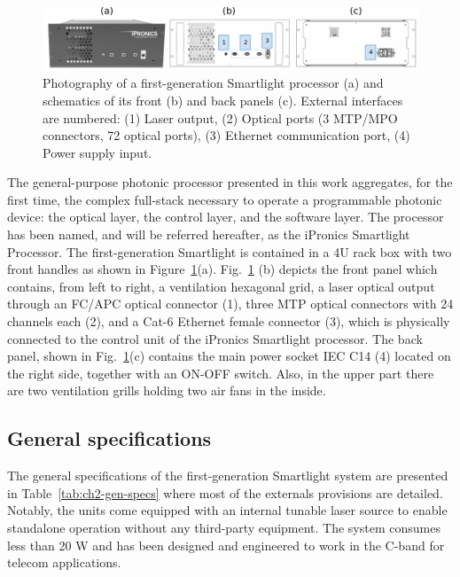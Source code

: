 \begin{figure}[h]
	\begin{center}
		\includegraphics{figures/ch2-smartlight.pdf}
	\end{center}
	\caption{Photography of a first-generation Smartlight processor (a) and schematics of its front (b) and back panels (c).
		External interfaces are numbered: (1) Laser output, (2) Optical ports (3 MTP/MPO connectors, 72 optical ports), (3) Ethernet communication port, (4) Power supply input.
	}\label{fig:ch2-smartlight}
\end{figure}

The general-purpose photonic processor presented in this work aggregates, for the first time, the complex full-stack necessary to operate a programmable photonic device: the optical layer, the control layer, and the software layer.
The processor has been named, and will be referred hereafter, as the iPronics Smartlight Processor.
The first-generation Smartlight is contained in a 4U rack box with two front handles as shown in Figure~\ref{fig:ch2-smartlight}(a).
Fig.~\ref{fig:ch2-smartlight} (b) depicts the front panel which contains, from left to right, a ventilation hexagonal grid, a laser optical output through an FC/APC optical connector (1), three MTP optical connectors with 24 channels each (2), and a Cat-6 Ethernet female connector (3), which is physically connected to the control unit of the iPronics Smartlight processor.
The back panel, shown in Fig.~\ref{fig:ch2-smartlight}(c) contains the main power socket IEC C14 (4) located on the right side, together with an ON-OFF switch.
Also, in the upper part there are two ventilation grills holding two air fans in the inside.

\subsection{General specifications}\label{sub:general_specifications} %

The general specifications of the first-generation Smartlight system are presented in Table~\ref{tab:ch2-gen-specs} where most of the externals provisions are detailed.
Notably, the units come equipped with an internal tunable laser source to enable standalone operation without any third-party equipment.
The system consumes less than 20 W and has been designed and engineered to work in the C-band for telecom applications.


